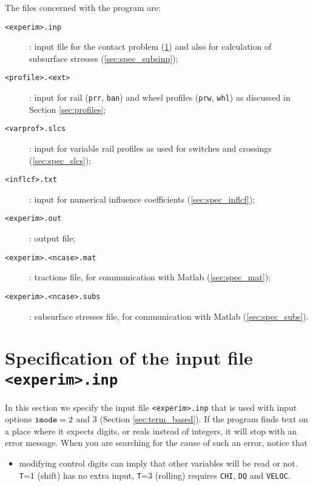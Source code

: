 \documentclass[12pt]{report}
\newcommand{\var}[1]{\mbox{\tt #1}}
\begin{document}
The files concerned with the program are:
\begin{description}
\item[{\tt <experim>.inp}]  : input file for the contact problem
        (\ref{sec:inputfile}) and also for calculation of subsurface
        stresses (\ref{sec:spec_subsinp});
\item[{\tt <profile>.<ext>}] : input for rail ({\tt prr}, {\tt ban})
        and wheel profiles ({\tt prw}, {\tt whl}) as discussed in Section
        \ref{sec:profiles};
\item[{\tt <varprof>.slcs}] : input for variable rail profiles as used for
        switches and crossings (\ref{sec:spec_slcs});
\item[\tt <inflcf>.txt] : input for numerical influence coefficients
        (\ref{sec:spec_inflcf});
\item[{\tt <experim>.out}]  : output file;
\item[{\tt <experim>.<ncase>.mat}]  : tractions file, for communication
        with Matlab (\ref{sec:spec_mat});
\item[{\tt <experim>.<ncase>.subs}] : subsurface stresses file, for
        communication with Matlab (\ref{sec:spec_subs}).
\end{description}

\section{Specification of the input file {\tt <experim>.inp}}
\label{sec:inputfile}

In this section we specify the input file {\tt <experim>.inp} that is used
with input options ${\tt imode}=2$ and 3 (Section \ref{sec:term_based}). If
the program finds text on a place where it expects digits, or reals instead
of integers, it will stop with an error message. When you are searching for
the cause of such an error, notice that
\begin{itemize}
\item modifying control digits can imply that other variables will be
        read or not. {\tt T}=1 (shift) has no extra input, {\tt T}=3 (rolling)
        requires \var{CHI}, \var{DQ} and \var{VELOC}.
\end{itemize}
\end{document}
